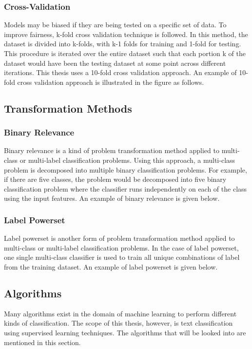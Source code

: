 \documentclass[a4paper,12pt,twoside]{report}
\begin{document}
\subsubsection{Cross-Validation} 
Models may be biased if they are being tested on a specific set of data. To improve fairness, k-fold cross validation technique is followed. In this method, the dataset is divided into k-folds, with k-1 folds for training and 1-fold for testing. This procedure is iterated over the entire dataset such that each portion k of the dataset would have been the testing dataset at some point across different iterations. This thesis uses a 10-fold cross validation approach. An example of 10-fold cross validation approach is illustrated in the figure as follows. 

\subsection{Transformation Methods}

\subsubsection{Binary Relevance} 
Binary relevance is a kind of problem transformation method applied to multi-class or multi-label classification problems. Using this approach, a multi-class problem is decomposed into multiple binary classification problems. For example, if there are five classes, the problem would be decomposed into five binary classification problem where the classifier runs independently on each of the class using the input features. An example of binary relevance is given below. 

\subsubsection{Label Powerset} 
Label powerset is another form of problem transformation method applied to multi-class or multi-label classification problems. In the case of label powerset, one single multi-class classifier is used to train all unique combinations of label from the training dataset. An example of label powerset is given below.

\subsection{Algorithms}
Many algorithms exist in the domain of machine learning to perform different kinds of classification. The scope of this thesis, however, is text classification using supervised learning techniques. The algorithms that will be looked into are mentioned in this section.
\end{document}
